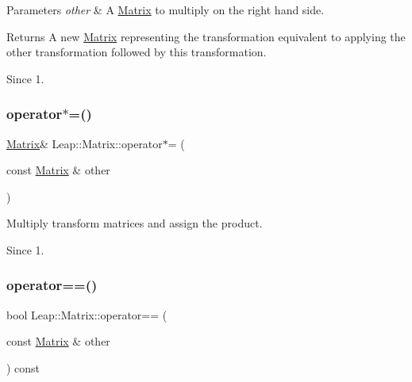 \begin{DoxyParams}{Parameters}
{\em other} & A \hyperlink{struct_leap_1_1_matrix}{Matrix} to multiply on the right hand side. \\
\hline
\end{DoxyParams}
\begin{DoxyReturn}{Returns}
A new \hyperlink{struct_leap_1_1_matrix}{Matrix} representing the transformation equivalent to applying the other transformation followed by this transformation. 
\end{DoxyReturn}
\begin{DoxySince}{Since}
1. 
\end{DoxySince}
\mbox{\label{struct_leap_1_1_matrix_a44df5bc99d32339961cd0f923c516dcd}} 
\subsubsection{\texorpdfstring{operator$\ast$=()}{operator*=()}}
{\footnotesize\ttfamily \hyperlink{struct_leap_1_1_matrix}{Matrix}\& Leap\+::\+Matrix\+::operator$\ast$= (\begin{DoxyParamCaption}\item[{const \hyperlink{struct_leap_1_1_matrix}{Matrix} \&}]{other }\end{DoxyParamCaption})\hspace{0.3cm}{\ttfamily [inline]}}

Multiply transform matrices and assign the product.


\begin{DoxyCodeInclude}
\end{DoxyCodeInclude}


\begin{DoxySince}{Since}
1. 
\end{DoxySince}
\mbox{\label{struct_leap_1_1_matrix_aa7e006236498192d08492e0e161d6692}} 
\subsubsection{\texorpdfstring{operator==()}{operator==()}}
{\footnotesize\ttfamily bool Leap\+::\+Matrix\+::operator== (\begin{DoxyParamCaption}\item[{const \hyperlink{struct_leap_1_1_matrix}{Matrix} \&}]{other }\end{DoxyParamCaption}) const\hspace{0.3cm}{\ttfamily [inline]}}

